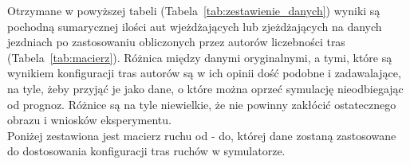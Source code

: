 \documentclass[polish]{projectreport}
\begin{document}
Otrzymane w powyższej tabeli (Tabela~\ref{tab:zestawienie_danych}) wyniki są pochodną sumarycznej ilości aut wjeżdżających lub zjeżdżających na danych jezdniach po zastosowaniu obliczonych przez autorów liczebności tras (Tabela~\ref{tab:macierz}). Różnica między danymi oryginalnymi, a tymi, które są wynikiem konfiguracji tras autorów są w ich opinii dość podobne i zadawalające, na tyle, żeby przyjąć je jako dane, o które można oprzeć symulację nieodbiegając od prognoz. Różnice są na tyle niewielkie, że nie powinny zakłócić ostatecznego obrazu i wniosków eksperymentu. \\

Poniżej zestawiona jest macierz ruchu od - do, której dane zostaną zastosowane do dostosowania konfiguracji tras ruchów w symulatorze. \\

\newcommand{\rotpion}[1]{\multicolumn{1}{c}{\rotatebox{90}{\rule{3mm}{0pt}\textbf{#1}\rule{2mm}{0pt}}}}
\end{document}
